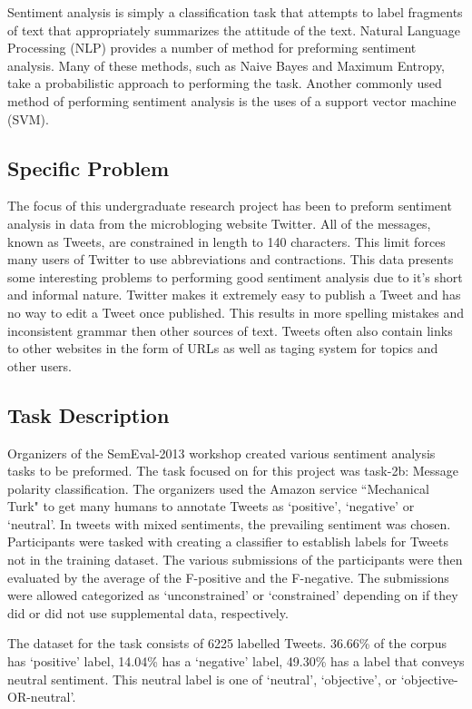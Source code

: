 \documentclass[final,3p,12pt]{elsarticle}
\begin{document}
Sentiment analysis is simply a classification task that attempts to label
fragments of text that appropriately summarizes the attitude of the text.
Natural Language Processing (NLP) provides a number of method for preforming
sentiment analysis. Many of these methods, such as Naive Bayes and Maximum
Entropy, take a probabilistic approach to performing the task. Another commonly
used method of performing sentiment analysis is the uses of a support vector
machine (SVM).


\subsection{Specific Problem}

The focus of this undergraduate research project has been to preform sentiment
analysis in data from the microbloging website Twitter. All of the messages,
known as Tweets, are constrained in length to 140 characters. This limit forces
many users of Twitter to use abbreviations and contractions. This data presents
some interesting problems to performing good sentiment analysis due to it's
short and informal nature. Twitter makes it extremely easy to publish a Tweet
and has no way to edit a Tweet once published. This results in more spelling
mistakes and inconsistent grammar then other sources of text. Tweets often also
contain links to other websites in the form of URLs as well as taging system
for topics and other users.

\subsection{Task Description}

Organizers of the SemEval-2013 workshop created various sentiment analysis
tasks to be preformed. The task focused on for this project was task-2b:
Message polarity classification. The organizers used the Amazon service
``Mechanical Turk" to get many humans to annotate Tweets as `positive',
`negative' or `neutral'. In tweets with mixed sentiments, the prevailing
sentiment was chosen. Participants were tasked with creating a classifier to
establish labels for Tweets not in the training dataset. The various
submissions of the participants were then evaluated by the average of the
F-positive and the F-negative. The submissions were allowed categorized as
`unconstrained' or `constrained' depending on if they did or did not use
supplemental data, respectively.

The dataset for the task consists of 6225 labelled Tweets. 36.66\% of the
corpus has `positive' label, 14.04\% has a `negative' label, 49.30\% has a
label that conveys neutral sentiment. This neutral label is one of `neutral',
`objective', or `objective-OR-neutral'.
\end{document}
